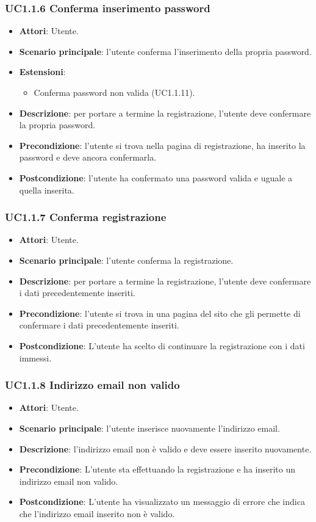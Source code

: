 \subsubsection{UC1.1.6 Conferma inserimento password}
\begin{itemize}
\item \textbf{Attori}: Utente.
\item \textbf{Scenario principale}: l'utente conferma l'inserimento della propria password.
\item \textbf{Estensioni}:
\begin{itemize}
\item Conferma password non valida (UC1.1.11).
\end{itemize}
\item \textbf{Descrizione}: per portare a termine la registrazione, l'utente deve confermare la propria password.
\item \textbf{Precondizione}: l'utente si trova nella pagina di registrazione, ha inserito la password e deve ancora confermarla.
\item \textbf{Postcondizione}: l'utente ha confermato una password valida e uguale a quella inserita.
\end{itemize}
\subsubsection{UC1.1.7 Conferma registrazione}
\begin{itemize}
\item \textbf{Attori}: Utente.
\item \textbf{Scenario principale}: l'utente conferma la registrazione.
\item \textbf{Descrizione}: per portare a termine la registrazione, l'utente deve confermare i dati precedentemente inseriti.
\item \textbf{Precondizione}: l'utente si trova in una pagina del sito  che gli permette di confermare i dati precedentemente inseriti.
\item \textbf{Postcondizione}: L'utente ha scelto di continuare la registrazione con i dati immessi.
\end{itemize}
\subsubsection{UC1.1.8 Indirizzo email non valido}
\begin{itemize}
\item \textbf{Attori}: Utente.
\item \textbf{Scenario principale}: l'utente inserisce nuovamente l'indirizzo email.
\item \textbf{Descrizione}: l'indirizzo email non è valido e deve essere inserito nuovamente.
\item \textbf{Precondizione}: L'utente sta effettuando la registrazione e ha inserito un indirizzo email non valido.
\item \textbf{Postcondizione}: L'utente ha visualizzato un messaggio di errore che indica che l'indirizzo email inserito non è valido.
\end{itemize}
